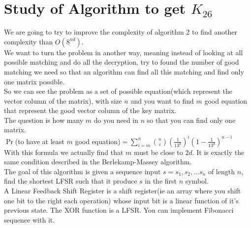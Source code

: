 \documentclass{article}
\begin{document}
\section{Study of Algorithm to get $K_{26}$}
We are going to try to improve the complexity of algorithm 2 to find another complexity than $O(8^{nd})$.\\
We want to turn the problem in another way, meaning instead of looking at all possible matching and do all the decryption, try to found the number of good matching we need so that an algorithm can find all this matching and find only one matrix possible.\\
So we can see the problem as a set of possible equation(which represent the vector column of the matrix), with size $n$ and you want to find $m$ good equation that represent the good vector column of the key matrix.\\
The question is how many $m$ do you need in $n$ so that you can find only one matrix.\\
$\Pr$(to have at least $m$ good equation)$=\sum_{i=m}^{n}{{n \choose i}(\frac{1}{13^d})^i (1-\frac{1}{13^d})^{n-i}}$\\
With this formula we actually find that $m$ must be close to $2d$. It is exactly the same condition described in the Berlekamp-Massey algorithm.\\
The goal of this algorithm is given a sequence input $s = s_1 , s_2 , ... s_n $ of length $n$, find the shortest LFSR such that it produce $s$ in the first $n$ symbol.\\
A Linear Feedback Shift Register is a shift register(ie an array where you shift one bit to the right each operation) whose input bit is a linear function of it's previous state. The XOR function is a LFSR. You can implement Fibonacci sequence with it.
\end{document}
